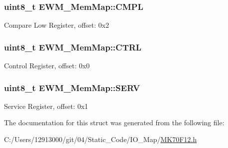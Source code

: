 \subsubsection[{C\+M\+P\+L}]{\setlength{\rightskip}{0pt plus 5cm}uint8\+\_\+t E\+W\+M\+\_\+\+Mem\+Map\+::\+C\+M\+P\+L}\label{struct_e_w_m___mem_map_ada0221f7554297f23a0257f54f28f5fc}
Compare Low Register, offset\+: 0x2 \hypertarget{struct_e_w_m___mem_map_a033a88d44ad1daa23ce3deb13bc94811}{}
\subsubsection[{C\+T\+R\+L}]{\setlength{\rightskip}{0pt plus 5cm}uint8\+\_\+t E\+W\+M\+\_\+\+Mem\+Map\+::\+C\+T\+R\+L}\label{struct_e_w_m___mem_map_a033a88d44ad1daa23ce3deb13bc94811}
Control Register, offset\+: 0x0 \hypertarget{struct_e_w_m___mem_map_aa9c25d4775f785d6911e096a226f4e40}{}
\subsubsection[{S\+E\+R\+V}]{\setlength{\rightskip}{0pt plus 5cm}uint8\+\_\+t E\+W\+M\+\_\+\+Mem\+Map\+::\+S\+E\+R\+V}\label{struct_e_w_m___mem_map_aa9c25d4775f785d6911e096a226f4e40}
Service Register, offset\+: 0x1 

The documentation for this struct was generated from the following file\+:\begin{DoxyCompactItemize}
\item 
C\+:/\+Users/12913000/git/04/\+Static\+\_\+\+Code/\+I\+O\+\_\+\+Map/\hyperlink{_m_k70_f12_8h}{M\+K70\+F12.\+h}\end{DoxyCompactItemize}
